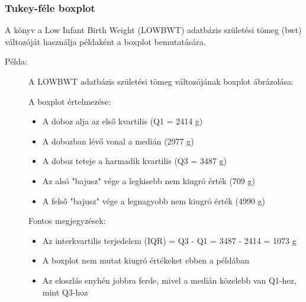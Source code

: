 \documentclass[a4paper,12pt]{article}
\begin{document}
    \subsubsection{Tukey-féle boxplot}

    A könyv a Low Infant Birth Weight (LOWBWT) adatbázis születési tömeg (bwt) változóját használja példaként a boxplot bemutatására.

    \begin{description}
        \item[Példa:] A LOWBWT adatbázis születési tömeg változójának boxplot ábrázolása:

        \begin{center}
        \end{center}

        A boxplot értelmezése:
        \begin{itemize}
            \item A doboz alja az első kvartilis (Q1 = 2414 g)
            \item A dobozban lévő vonal a medián (2977 g)
            \item A doboz teteje a harmadik kvartilis (Q3 = 3487 g)
            \item Az alsó "bajusz" vége a legkisebb nem kiugró érték (709 g)
            \item A felső "bajusz" vége a legnagyobb nem kiugró érték (4990 g)
        \end{itemize}

        Fontos megjegyzések:
        \begin{itemize}
            \item Az interkvartilis terjedelem (IQR) = Q3 - Q1 = 3487 - 2414 = 1073 g
            \item A boxplot nem mutat kiugró értékeket ebben a példában
            \item Az eloszlás enyhén jobbra ferde, mivel a medián közelebb van Q1-hez, mint Q3-hoz
        \end{itemize}
    \end{description}
\end{document}
